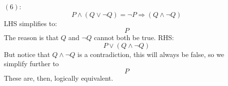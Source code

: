 \begin{solution}
    $(6)$:
    $$
    P\land (Q\lor \neg Q) = \neg P\Rightarrow (Q\land \neg Q)
    $$
    LHS simplifies to: 
    $$
    P
    $$
    The reason is that $Q$ and $\neg Q$ cannot both be true. 
    RHS: 
    $$
    P \lor (Q\land \neg Q)
    $$
    But notice that $Q\land\neg Q$ is a contradiction, this will always be false, so we simplify further to 
    $$
    P
    $$
    These are, then, logically equivalent. 

\end{solution}